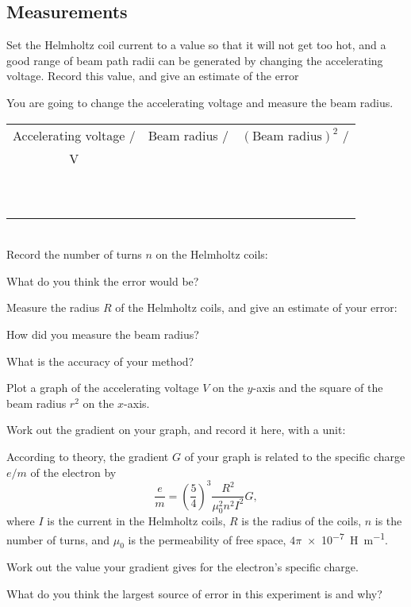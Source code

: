 \subsection{Measurements}
Set the Helmholtz coil current to a value so that it will not get too hot, and a good range of beam path radii can be generated by changing the accelerating voltage.  Record this value, and give an estimate of the error \answerline

You are going to change the accelerating voltage and measure the beam radius.\\

\begin{tabular}{|c|c|c|}
\hline
Accelerating voltage / & Beam radius / & $(\text{Beam radius})^{2}$ / \\
V & & \\
\hline 
&& \\
\hline
&& \\
\hline
&& \\
\hline
&& \\
\hline
&& \\
\hline
&& \\
\hline
&& \\
\hline
&& \\
\hline
&& \\
\hline
&& \\
\hline
\end{tabular}\\

Record the number of turns $n$ on the Helmholtz coils: \answerline

What do you think the error would be? \answerline

Measure the radius $R$ of the Helmholtz coils, and give an estimate of your error: \answerline

\begin{questions}
\question How did you measure the beam radius? \fillwithlines{2cm}

\question What is the accuracy of your method? \fillwithlines{1cm}

\question Plot a graph of the accelerating voltage $V$ on the $y$-axis and the square of the beam radius $r^{2}$ on the $x$-axis.

\question Work out the gradient on your graph, and record it here, with a unit: \answerline

According to theory, the gradient $G$ of your graph is related to the specific charge $e/m$ of the electron by
\[\frac{e}{m}=\left(\frac{5}{4}\right)^{3} \frac{R^{2}}{\mu_{0}^{2}n^{2}I^{2}} G,\]
where $I$ is the current in the Helmholtz coils, $R$ is the radius of the coils, $n$ is the number of turns, and $\mu_{0}$ is the permeability of free space, $4\pi$\SI{e-7}{H.m^{-1}}.

\question Work out the value your gradient gives for the electron's specific charge.\fillwithlines{2cm}

\question What do you think the largest source of error in this experiment is and why? \fillwithlines{3cm}

\end{questions}
